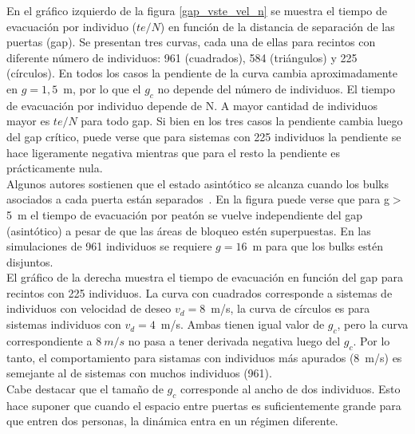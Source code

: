 En el gráfico izquierdo de la figura \ref{gap_vste_vel_n} se muestra el tiempo de evacuación por individuo ($te/N$) en función de la distancia de separación de las puertas (gap). Se presentan tres curvas, cada una de ellas para recintos con diferente número de individuos: 961 (cuadrados), 584 (triángulos) y 225 (círculos). En todos los casos la pendiente de la curva cambia aproximadamente en $g=1,5$~m, por lo que el $g_c$ no depende del número de individuos. 
El tiempo de evacuación por individuo depende de N. A mayor cantidad de individuos mayor es $te/N$ para todo gap. 
Si bien en los tres casos la pendiente cambia luego del gap crítico, puede verse que para sistemas con 225 individuos la pendiente se hace ligeramente negativa mientras que para el resto la pendiente es prácticamente nula. \\
Algunos autores sostienen que el estado asintótico se alcanza cuando los bulks asociados a cada puerta están separados~\cite{perez1}. En la figura puede verse que para g$>$5~m el tiempo de evacuación por peatón se vuelve independiente del gap (asintótico) a pesar de que las áreas de bloqueo estén superpuestas. En las simulaciones de 961 individuos se requiere $g=16$~m para que los bulks estén disjuntos.\\
El gráfico de la derecha muestra el tiempo de evacuación en función del gap para recintos con 225 individuos. La curva con cuadrados corresponde a sistemas de individuos con velocidad de deseo $v_d=8$~m/s, la curva de círculos es para sistemas individuos con $v_d=4$~m/s. Ambas tienen igual valor de $g_c$, pero la curva correspondiente a $8~m/s$ no pasa a tener derivada negativa luego del $g_c$. Por lo tanto, el comportamiento para sistamas con individuos más apurados (8~m/s) es semejante al de sistemas con muchos individuos (961). \\
Cabe destacar que el tamaño de $g_c$ corresponde al ancho de dos individuos. Esto hace suponer que cuando el espacio entre puertas es suficientemente grande para que entren dos personas, la dinámica entra en un régimen diferente. 

